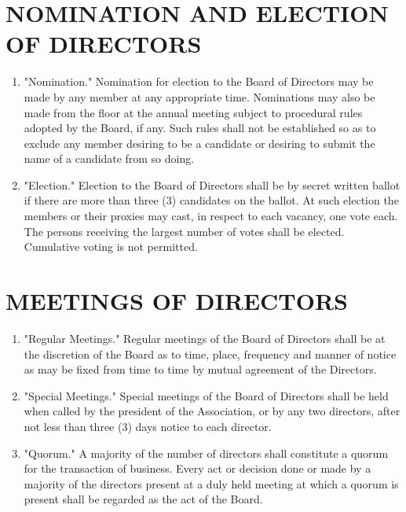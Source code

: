 \documentclass[12pt, letterpaper]{article}
\begin{document}
\section{NOMINATION AND ELECTION OF DIRECTORS}
\begin{enumerate}
 \item "Nomination."
  Nomination for election to the Board of Directors may be made by any member at any appropriate time.
  Nominations may also be made from the floor at the annual meeting subject to procedural rules adopted by the Board, if any.
  Such rules shall not be established so as to exclude any member desiring to be a candidate or desiring to submit the name of a candidate from so doing.
 \item "Election."
  Election to the Board of Directors shall be by secret written ballot if there are more than three (3) candidates on the ballot.  At such election the members or their proxies may cast, in respect to each vacancy, one vote each.
  The persons receiving the largest number of votes shall be elected.
  Cumulative voting is not permitted.
\end{enumerate}

\section{MEETINGS OF DIRECTORS}
\begin{enumerate}
 \item "Regular Meetings."
  Regular meetings of the Board of Directors shall be at the discretion of the Board as to time, place, frequency and manner of notice as may be fixed from time to time by mutual agreement of the Directors.
 \item "Special Meetings."
  Special meetings of the Board of Directors shall be held when called by the president of the Association, or by any two directors, after not less than three (3) days notice to each director.
 \item "Quorum." A majority of the number of directors shall constitute a quorum for the transaction of business.
  Every act or decision done or made by a majority of the directors present at a duly held meeting at which a quorum is present shall be regarded as the act of the Board.
\end{enumerate}

\end{document}
